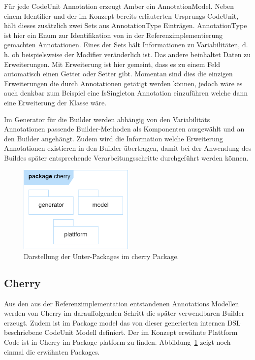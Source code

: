\documentclass[12pt,oneside,a4paper,parskip]{scrbook}
\begin{document}
Für jede CodeUnit Annotation erzeugt Amber ein AnnotationModel. Neben einem Identifier und der im Konzept bereits erläuterten Ursprungs-CodeUnit, hält dieses zusätzlich zwei Sets aus AnnotationType Einträgen. AnnotationType ist hier ein Enum zur Identifikation von in der Referenzimplementierung gemachten Annotationen. Eines der Sets hält Informationen zu Variabilitäten, d. h. ob beispielsweise der Modifier veränderlich ist. Das andere beinhaltet Daten zu Erweiterungen. Mit Erweiterung ist hier gemeint, dass es zu einem Feld automatisch einen Getter oder Setter gibt. Momentan sind dies die einzigen Erweiterungen die durch Annotationen getätigt werden können, jedoch wäre es auch denkbar zum Beispiel eine IsSingleton Annotation einzuführen welche dann eine Erweiterung der Klasse wäre.

Im Generator für die Builder werden abhängig von den Variabilitäts Annotationen passende Builder-Methoden als Komponenten ausgewählt und an den Builder angehängt. Zudem wird die Information welche Erweiterung Annotationen existieren in den Builder übertragen, damit bei der Anwendung des Buildes später entsprechende Verarbeitungsschritte durchgeführt werden können.

\begin{figure}[htbp]
	\centering
	\includegraphics[width=0.5\textwidth]{bilder/cherry}
	\caption{Darstellung der Unter-Packages im cherry Package.}
	\label{fig:cherryPackages}
\end{figure}

\subsection{Cherry}

Aus den aus der Referenzimplementation entstandenen Annotations Modellen werden von Cherry im darauffolgenden Schritt die später verwendbaren Builder erzeugt. Zudem ist im Package model das von dieser generierten internen DSL beschriebene CodeUnit Modell definiert. Der im Konzept erwähnte Plattform Code ist in Cherry im Package platform zu finden. Abbildung~\ref{fig:cherryPackages} zeigt noch einmal die erwähnten Packages.
\end{document}
